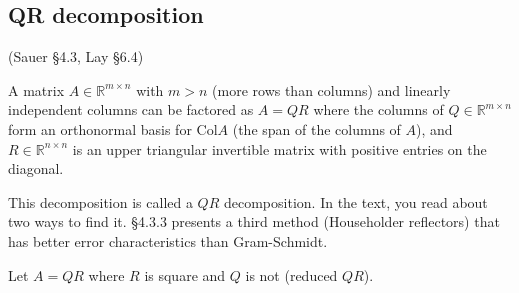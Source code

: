 \documentclass[12pt,letterpaper,noanswers]{exam}
\begin{document}
\subsection{QR decomposition}

(Sauer \S4.3, Lay \S 6.4)

A matrix $A\in\mathbb{R}^{m\times n}$ with $m>n$ (more rows than columns) and linearly independent columns can be factored as $A = QR$ where the columns of $Q\in\mathbb{R}^{m\times n}$ form an orthonormal basis for $\text{Col} A$ (the span of the columns of $A$), and $R\in \mathbb{R}^{n\times n}$ is an upper triangular invertible matrix with positive entries on the diagonal.

This decomposition is called a $QR$ decomposition.  In the text, you read about two ways to find it.  \S 4.3.3 presents a third method (Householder reflectors) that has better error characteristics than Gram-Schmidt.


Let $A = QR$ where $R$ is square and $Q$ is not (reduced $QR$).
\end{document}
